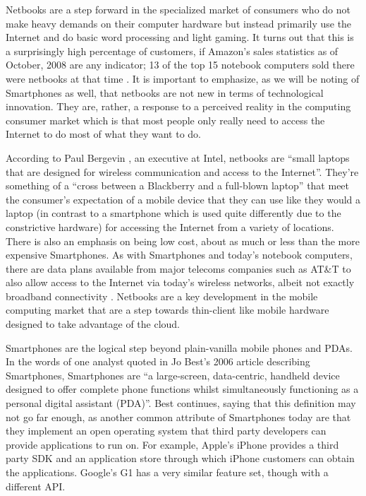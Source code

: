 Netbooks are a step forward in the specialized market of consumers who do not
make heavy demands on their computer hardware but instead primarily use the
Internet and do basic word processing and light gaming.  It turns out that this
is a surprisingly high percentage of customers, if Amazon's sales statistics as
of October, 2008 are any indicator; 13 of the top 15 notebook computers sold
there were netbooks at that time \citep{copeland2008}.  It is important to
emphasize, as we will be noting of Smartphones as well, that netbooks are not
new in terms of technological innovation.  They are, rather, a response to a
perceived reality in the computing consumer market which is that most people
only really need to access the Internet to do most of what they want to do.

According to Paul Bergevin \citeyearpar{bergevin2008}, an executive at Intel,
netbooks are ``small laptops that are designed for wireless communication and
access to the Internet''.  They're something of a ``cross between a Blackberry
and a full-blown laptop'' \citep{copeland2008} that meet the consumer's
expectation of a mobile device that they can use like they would a laptop (in
contrast to a smartphone which is used quite differently due to the constrictive
hardware) for accessing the Internet from a variety of locations.  There is also
an emphasis on being low cost, about as much or less than the more expensive
Smartphones.  As with Smartphones and today's notebook computers, there are data
plans available from major telecoms companies such as AT\&T to also allow access
to the Internet via today's wireless networks, albeit not exactly broadband
connectivity \citep{ap2009}.  Netbooks are a key development in the mobile
computing market that are a step towards thin-client like mobile hardware
designed to take advantage of the cloud.

Smartphones are the logical step beyond plain-vanilla mobile phones and PDAs.
In the words of one analyst quoted in Jo Best's 2006 article describing
Smartphones, Smartphones are ``a large-screen, data-centric, handheld device
designed to offer complete phone functions whilst simultaneously functioning as
a personal digital assistant (PDA)''.  Best continues, saying that this
definition may not go far enough, as another common attribute of Smartphones
today are that they implement an open operating system that third party
developers can provide applications to run on.  For example, Apple's iPhone
provides a third party SDK and an application store through which iPhone
customers can obtain the applications.  Google's G1 has a very similar feature
set, though with a different API.

